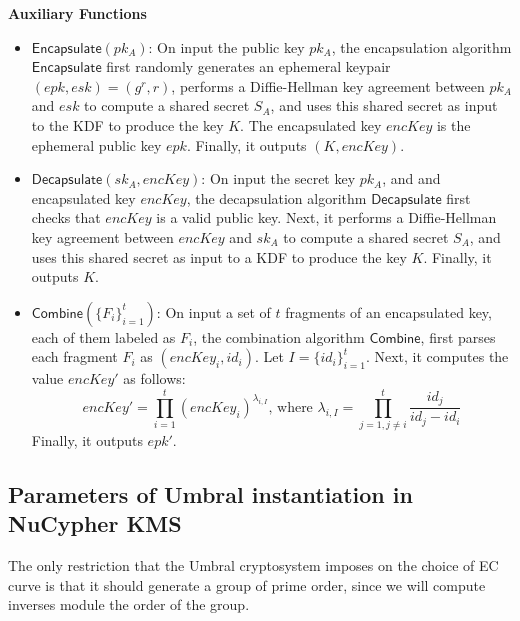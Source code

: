 \documentclass[12pt]{article}
\begin{document}
\textbf{Auxiliary Functions}
\begin{itemize}
	\item $\mathsf{Encapsulate}(pk_A)$: On input the public key $pk_A$, %
	the encapsulation algorithm $\mathsf{Encapsulate}$ first randomly generates an ephemeral keypair $(epk, esk) = (g^r, r)$, performs a Diffie-Hellman key agreement between $pk_A$ and $esk$ to compute a shared secret $S_A$, and uses this shared secret as input to the KDF to produce the key $K$. The encapsulated key $encKey$ is the ephemeral public key $epk$. Finally, it outputs $(K, encKey)$.
	\item $\mathsf{Decapsulate}(sk_A, encKey)$: On input the secret key $pk_A$, and and encapsulated key $encKey$, the decapsulation algorithm $\mathsf{Decapsulate}$ first checks that $encKey$ is a valid public key. 
	Next, it performs a Diffie-Hellman key agreement between $encKey$ and $sk_A$ to compute a shared secret $S_A$, and uses this shared secret as input to a KDF to produce the key $K$. Finally, it outputs $K$.
	\item $\mathsf{Combine}(\{F_i\}_{i=1}^t)$: On input a set of $t$ fragments of an encapsulated key, each of them labeled as $F_i$, the combination algorithm $\mathsf{Combine}$, first parses each fragment $F_i$ as $(encKey_i, id_i)$. %
Let $I = \{id_i\}_{i=1}^t$. Next, it computes the value $encKey'$ as follows:
$$encKey' = \prod\limits_{i=1}^{t} (encKey_i)^{\lambda_{i, I}}
\text{, where } \lambda_{i, I} = \prod\limits_{j=1, j\neq i}^{t} \frac{id_j}{id_j-id_i}$$
Finally, it outputs $epk'$.
\end{itemize}

\subsection{Parameters of Umbral instantiation in NuCypher KMS}
The only restriction that the Umbral cryptosystem imposes on the choice of EC curve is that it should generate a group of prime order, since we will compute inverses module the order of the group.






\end{document}
